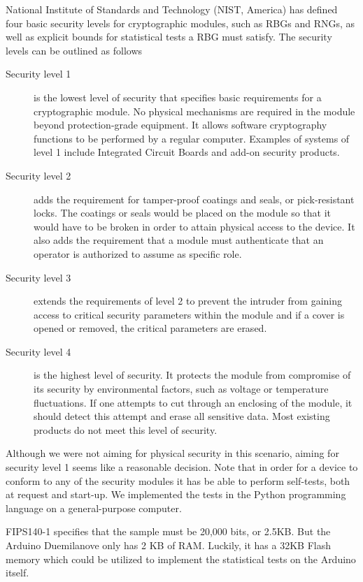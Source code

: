 \documentclass[a4paper]{article}           %
\begin{document}
National Institute of Standards and Technology (NIST, America) has defined ~\cite{fips140} four basic security levels for cryptographic modules, such as RBGs and RNGs, as well as explicit bounds for statistical tests a RBG must satisfy. The security levels can be outlined as follows

\begin{description}
\item[Security level 1] is the lowest level of security that specifies basic requirements for a cryptographic module. No physical mechanisms are required in the module beyond protection-grade equipment. It allows software cryptography functions to be performed by a regular computer. Examples of systems of level 1 include Integrated Circuit Boards and add-on security products. 

\item[Security level 2] adds the requirement for tamper-proof coatings and seals, or pick-resistant locks. The coatings or seals would be placed on the module so that it would have to be broken in order to attain physical access to the device. It also adds the requirement that a module must authenticate that an operator is authorized to assume as specific role. 

\item[Security level 3] extends the requirements of level 2 to prevent the intruder from gaining access to critical security parameters within the module and if a cover is opened or removed, the critical parameters are erased. 

\item[Security level 4] is the highest level of security. It protects the module from compromise of its security by environmental factors, such as voltage or temperature fluctuations. If one attempts to cut through an enclosing of the module, it should detect this attempt and erase all sensitive data. Most existing products do not meet this level of security. 
\end{description}

Although we were not aiming for physical security in this scenario, aiming for security level 1 seems like a reasonable decision. Note that in order for a device to conform to any of the security modules it has be able to perform self-tests, both at request and start-up. We implemented the tests in the Python programming language on a general-purpose computer. 

FIPS140-1 specifies that the sample must be 20,000 bits, or 2.5KB. But the Arduino Duemilanove only has 2 KB of RAM. Luckily, it has a 32KB Flash memory which could be utilized to implement the statistical tests on the Arduino itself. 
\end{document}

